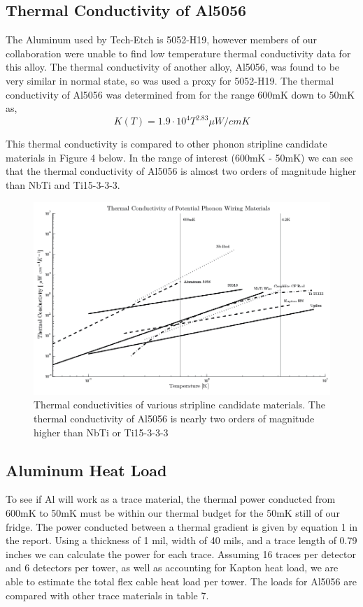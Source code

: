 \documentclass{report}
\begin{document}
\subsection{Thermal Conductivity of Al5056}

The Aluminum used by Tech-Etch is 5052-H19, however members of our collaboration were unable to find low temperature thermal conductivity data for this alloy. The thermal conductivity of another alloy, Al5056, was found to be very similar in normal state, so was used a proxy for 5052-H19. The thermal conductivity of Al5056 was determined from \cite{coc} for the range 600mK down to 50mK as,
\begin{equation}
K(T) = 1.9 \cdot 10^{4} T^{2.83} \mu W/cmK
\end{equation}

This thermal conductivity is compared to other phonon stripline candidate materials in Figure 4 below. In the range of interest (600mK - 50mK) we can see that the thermal conductivity of Al5056 is almost two orders of magnitude higher than NbTi and Ti15-3-3-3.

\begin{figure}[h]
\includegraphics[width = .87\textwidth]{Cable_Therm_Graph.png}
\caption{Thermal conductivities of various stripline candidate materials. The thermal conductivity of Al5056 is nearly two orders of magnitude higher than NbTi or Ti15-3-3-3}
\end{figure}


\subsection{Aluminum Heat Load}

To see if Al will work as a trace material, the thermal power conducted from 600mK to 50mK must be within our thermal budget for the 50mK still of our fridge. The power conducted between a thermal gradient is given by equation 1 in the report. Using a thickness of 1 mil, width of 40 mils, and a trace length of 0.79 inches we can calculate the power for each trace. Assuming 16 traces per detector and 6 detectors per tower, as well as accounting for Kapton heat load, we are able to estimate the total flex cable heat load per tower. The loads for Al5056 are compared with other trace materials in table 7.
\end{document}
